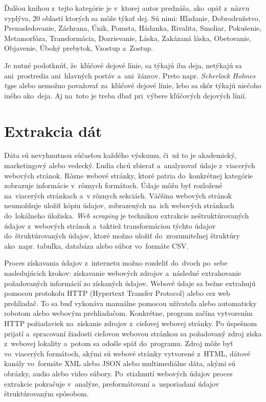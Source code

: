 Ďalšou knihou z~tejto kategórie je  \cite{Tobias:1993} v~ktorej autor prednáša, ako~opäť z~názvu vyplýva, 20 oblastí ktorých sa môže týkať dej. Sú nimi: Hľadanie, Dobrodružstvo, Prenasledovanie, Záchrana, Únik, Pomsta, Hádanka, Rivalita, Smoliar, Pokušenie, Metamorfóza, Transformácia, Dozrievanie, Láska, Zakázaná láska, Obetovanie, Objavenie, Úbohý prebytok, Vzostup a~Zostup. 

Je nutné podotknúť, že~kľúčové dejové línie, sa týkajú iba deja, netýkajú sa ani~prostredia ani~hlavných postáv a~ani~žánrov. Preto napr. \textit{Scherlock Holmes type} alebo \textit{} nemožno považovať za~kľúčové dejové línie, lebo sa skôr týkajú niečoho iného ako~deja. Aj na~toto je treba dbať pri~výbere kľúčových dejových línií.


\section{Extrakcia dát}
\label{webscraping}

Dáta sú nevyhnutnou súčasťou každého výskumu, či~už to je akademický, marketingový alebo vedecký. Ľudia chcú zbierať a~analyzovať údaje z~viacerých webových stránok. Rôzne webové stránky, ktoré patria do~konkrétnej kategórie zobrazuje informácie v~rôznych formátoch. Údaje môžu byť rozložené na~viacerých stránkach a~v rôznych sekciách. Väčšina webových stránok neumožňuje uložiť kópiu údajov, zobrazených na~ich webových stránkach do~lokálneho úložiska. \textit{Web scraping} je technikou extrakcie neštruktúrovaných údajov z~webových stránok a~taktiež transformáciou týchto údajov do~štruktúrovaných údajov, ktoré možno uložiť do~zrozumiteľnej štruktúry ako~napr. tabuľka, databáza alebo súbor vo~formáte CSV. 

Proces získavania údajov z~internetu možno rozdeliť do~dvoch po~sebe nasledujúcich krokov: získavanie webových zdrojov a~následné extrahovanie požadovaných informácií zo získaných údajov. Webové údaje sa bežne extrahujú pomocou protokolu HTTP (Hypertext Transfer Protocol) alebo cez web prehliadač. To sa buď vykonáva manuálne pomocou užívateľa alebo automaticky robotom alebo webovým prehliadačom. Konkrétne, program začína vytvorením HTTP požiadaviek na~získanie zdrojov z~cieľovej webovej stránky. Po úspešnom prijatí a~spracovaní žiadosti cieľovou webovou stránkou sa požadovaný zdroj získa z~webovej lokality a~potom sa odošle späť do~programu. Zdroj môže byť vo~viacerých formátoch, akými sú webové stránky vytvorené z~HTML, dátové kanály vo~formáte XML alebo JSON alebo multimediálne dáta, akými sú obrázky, audio alebo video súbory. Po~stiahnutí webových údajov proces extrakcie pokračuje v~analýze, preformátovaní a~usporiadaní údajov štruktúrovaným spôsobom. 

